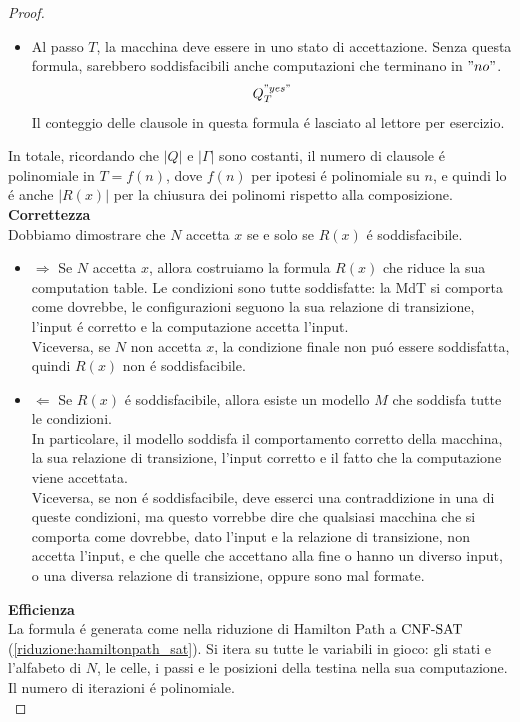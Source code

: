 \begin{proof}
\begin{itemize}
    \item Al passo $T$, la macchina deve essere in uno stato di accettazione. 
    Senza questa formula, sarebbero soddisfacibili anche computazioni che terminano in $"no"$.\\
    \[
    Q_T^{"yes"}
    \]
    Il conteggio delle clausole in questa formula é lasciato al lettore per esercizio.\\
\end{itemize}

In totale, ricordando che $|Q|$ e $|\Gamma|$ sono costanti,
il numero di clausole é polinomiale in $T=f(n)$, 
dove $f(n)$ per ipotesi é polinomiale su $n$, 
e quindi lo é anche $|R(x)|$ 
per la chiusura dei polinomi rispetto alla composizione.\\

\textbf{Correttezza}\\
Dobbiamo dimostrare che $N$ accetta $x$ se e solo se $R(x)$ é soddisfacibile.\\
\begin{itemize}
    \item $\Rightarrow$ Se $N$ accetta $x$, allora costruiamo la formula $R(x)$ che riduce la sua computation table.
    Le condizioni sono tutte soddisfatte: la MdT si comporta come dovrebbe, 
    le configurazioni seguono la sua relazione di transizione, l'input é corretto
    e la computazione accetta l'input.\\
    Viceversa, se $N$ non accetta $x$, la condizione finale non puó essere soddisfatta, quindi $R(x)$ non é soddisfacibile.\\
    \item $\Leftarrow$ Se $R(x)$ é soddisfacibile, allora esiste un modello $M$ che soddisfa tutte le condizioni.\\
    In particolare, il modello soddisfa il comportamento corretto della macchina,
    la sua relazione di transizione, l'input corretto e il fatto che la computazione viene accettata.\\
    Viceversa, se non é soddisfacibile, deve esserci una contraddizione in una di queste condizioni,
    ma questo vorrebbe dire che qualsiasi macchina che si comporta come dovrebbe, dato l'input e la relazione di transizione,
    non accetta l'input, e che quelle che accettano alla fine o hanno un diverso input, o una diversa relazione di transizione,
    oppure sono mal formate.\\
\end{itemize}

\textbf{Efficienza}\\
La formula é generata come nella riduzione di Hamilton Path a $\text{CNF-SAT}$ (\ref{riduzione:hamiltonpath_sat}).
Si itera su tutte le variabili in gioco: gli stati e l'alfabeto di $N$, 
le celle, i passi e le posizioni della testina nella sua computazione.\\
Il numero di iterazioni é polinomiale.\\


\end{proof}
